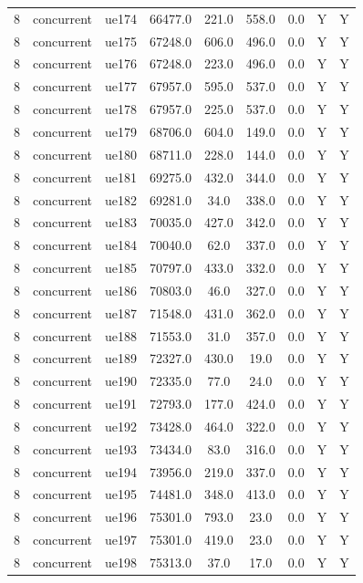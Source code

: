 \begin{table}[ht]
\begin{tabular}{|c|c|c|c|c|c|c|c|c|}
8 & concurrent & ue174 & 66477.0 & 221.0 & 558.0 & 0.0 & Y & Y \\
8 & concurrent & ue175 & 67248.0 & 606.0 & 496.0 & 0.0 & Y & Y \\
8 & concurrent & ue176 & 67248.0 & 223.0 & 496.0 & 0.0 & Y & Y \\
8 & concurrent & ue177 & 67957.0 & 595.0 & 537.0 & 0.0 & Y & Y \\
8 & concurrent & ue178 & 67957.0 & 225.0 & 537.0 & 0.0 & Y & Y \\
8 & concurrent & ue179 & 68706.0 & 604.0 & 149.0 & 0.0 & Y & Y \\
8 & concurrent & ue180 & 68711.0 & 228.0 & 144.0 & 0.0 & Y & Y \\
8 & concurrent & ue181 & 69275.0 & 432.0 & 344.0 & 0.0 & Y & Y \\
8 & concurrent & ue182 & 69281.0 & 34.0 & 338.0 & 0.0 & Y & Y \\
8 & concurrent & ue183 & 70035.0 & 427.0 & 342.0 & 0.0 & Y & Y \\
8 & concurrent & ue184 & 70040.0 & 62.0 & 337.0 & 0.0 & Y & Y \\
8 & concurrent & ue185 & 70797.0 & 433.0 & 332.0 & 0.0 & Y & Y \\
8 & concurrent & ue186 & 70803.0 & 46.0 & 327.0 & 0.0 & Y & Y \\
8 & concurrent & ue187 & 71548.0 & 431.0 & 362.0 & 0.0 & Y & Y \\
8 & concurrent & ue188 & 71553.0 & 31.0 & 357.0 & 0.0 & Y & Y \\
8 & concurrent & ue189 & 72327.0 & 430.0 & 19.0 & 0.0 & Y & Y \\
8 & concurrent & ue190 & 72335.0 & 77.0 & 24.0 & 0.0 & Y & Y \\
8 & concurrent & ue191 & 72793.0 & 177.0 & 424.0 & 0.0 & Y & Y \\
8 & concurrent & ue192 & 73428.0 & 464.0 & 322.0 & 0.0 & Y & Y \\
8 & concurrent & ue193 & 73434.0 & 83.0 & 316.0 & 0.0 & Y & Y \\
8 & concurrent & ue194 & 73956.0 & 219.0 & 337.0 & 0.0 & Y & Y \\
8 & concurrent & ue195 & 74481.0 & 348.0 & 413.0 & 0.0 & Y & Y \\
8 & concurrent & ue196 & 75301.0 & 793.0 & 23.0 & 0.0 & Y & Y \\
8 & concurrent & ue197 & 75301.0 & 419.0 & 23.0 & 0.0 & Y & Y \\
8 & concurrent & ue198 & 75313.0 & 37.0 & 17.0 & 0.0 & Y & Y \\

\end{tabular}
\end{table}
